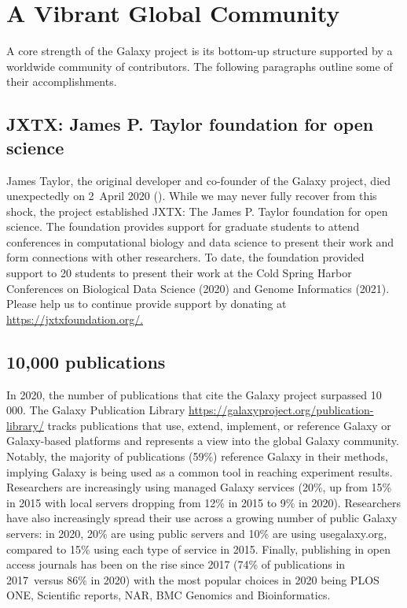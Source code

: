 \section*{A Vibrant Global Community}
A core strength of the Galaxy project is its bottom-up structure supported by a worldwide community of contributors. The following paragraphs outline some of their accomplishments.


\subsection*{JXTX: James P. Taylor foundation for open science}
James Taylor, the original developer and co-founder of the Galaxy project, died unexpectedly on 2 April 2020 (\cite{Nekrutenko_2020}). While we may never fully recover from this shock, the project established JXTX: The James P. Taylor foundation for open science. The foundation provides support for graduate students to attend conferences in computational biology and data science to present their work and form connections with other researchers. To date, the foundation provided support to 20 students to present their work at the Cold Spring Harbor Conferences on Biological Data Science (2020) and Genome Informatics (2021). Please help us to continue provide support by donating at \url{https://jxtxfoundation.org/.}

\subsection*{10,000 publications}
In 2020, the number of publications that cite the Galaxy project surpassed 10 000. The Galaxy Publication Library \url{https://galaxyproject.org/publication-library/} tracks publications that use, extend, implement, or reference Galaxy or Galaxy-based platforms and represents a view into the global Galaxy community. Notably, the majority of publications (59\%) reference Galaxy in their methods, implying Galaxy is being used as a common tool in reaching experiment results. Researchers are increasingly using managed Galaxy services (20\%, up from 15\% in 2015 with local servers dropping from 12\% in 2015 to 9\% in 2020). Researchers have also increasingly spread their use across a growing number of public Galaxy servers: in 2020, 20\% are using public servers and 10\% are using usegalaxy.org, compared to 15\% using each type of service in 2015. Finally, publishing in open access journals has been on the rise since 2017 (74\% of publications in 2017 versus 86\% in 2020) with the most popular choices in 2020 being PLOS ONE, Scientific reports, NAR, BMC Genomics and Bioinformatics.


